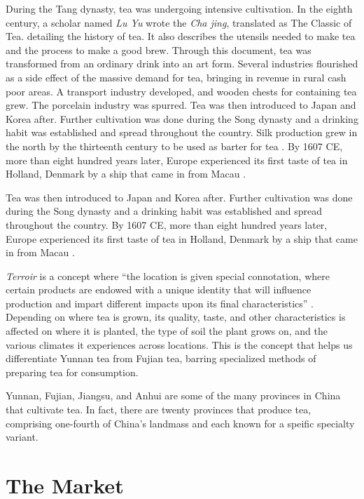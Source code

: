 During the Tang dynasty, tea was undergoing intensive cultivation. In the
eighth century, a scholar named \emph{Lu Yu} wrote the \emph{Cha jing},
translated as The Classic of Tea. detailing the history of tea. It also
describes the utensils needed to make tea and the process to make a good brew.
Through this document, tea was transformed from an ordinary drink into an art
form. Several industries flourished as a side effect of the massive demand for
tea, bringing in revenue in rural cash poor areas. A transport industry
developed, and wooden chests for containing tea grew. The porcelain industry was
spurred. Tea was then introduced to Japan and Korea after. Further cultivation
was done during the Song dynasty and a drinking habit was established and spread
throughout the country. Silk production grew in the north by the thirteenth
century to be used as barter for tea \autocite[2-10]{chow_all_1990}. By 1607 CE,
more than eight hundred years later, Europe experienced its first taste of tea
in Holland, Denmark by a ship that came in from Macau \autocite{chen_tea_2012}.

Tea was then introduced to Japan and Korea after. Further cultivation was done
during the Song dynasty and a drinking habit was established and spread
throughout the country. By 1607 CE, more than eight hundred years later, Europe
experienced its first taste of tea in Holland, Denmark by a ship that came in
from Macau \autocite{chen_tea_2012}.

\emph{Terroir} is a concept where ``the location is given special connotation,
where certain products are endowed with a unique identity that will influence
production and impart different impacts upon its final characteristics''
\autocite{silva_characterization_2014}. Depending on where tea is grown, its
quality, taste, and other characteristics is affected on where it is planted,
the type of soil the plant grows on, and the various climates it experiences
across locations. This is the concept that helps us differentiate Yunnan tea
from Fujian tea, barring specialized methods of preparing tea for consumption.

Yunnan, Fujian, Jiangsu, and Anhui are some of the many provinces in China that
cultivate tea. In fact, there are twenty provinces that produce tea, comprising
one-fourth of China's landmass \autocite{chen_tea_2012} and each known for a
speific specialty variant.

\section{The Market}

